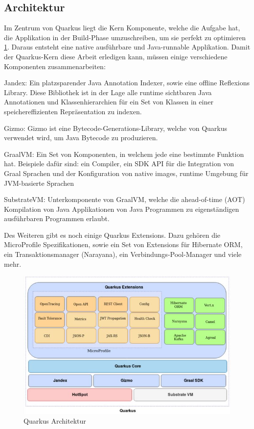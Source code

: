 \subsection{Architektur}
Im Zentrum von Quarkus liegt die Kern Komponente, welche die Aufgabe hat, die Applikation in der Build-Phase umzuschreiben, um sie perfekt zu optimieren \ref{fig:impl:QuarkusArchitektur}. Daraus entsteht eine native ausführbare und Java-runnable Applikation. Damit der Quarkus-Kern diese Arbeit erledigen kann, müssen einige verschiedene Komponenten zusammenarbeiten:
 
\begin{compactitem}
    \item Jandex: Ein platzsparender Java Annotation Indexer, sowie eine offline Reflexions Library. Diese Bibliothek ist in der Lage alle runtime sichtbaren Java Annotationen und Klassenhierarchien für ein Set von Klassen in einer speichereffizienten Repräsentation zu indexen.    
    \item Gizmo: Gizmo ist eine Bytecode-Generations-Library, welche von Quarkus verwendet wird, um Java Bytecode zu produzieren.             
    \item GraalVM: Ein Set von Komponenten, in welchem jede eine bestimmte Funktion hat. Beispiele dafür sind: ein Compiler, ein SDK API für die Integration von Graal Sprachen und der Konfiguration von native images, runtime Umgebung für JVM-basierte Sprachen
    \item SubstrateVM: Unterkomponente von GraalVM, welche die ahead-of-time (AOT) Kompilation von Java Applikationen von Java Programmen zu eigenständigen ausführbaren Programmen erlaubt.
\end{compactitem}
 
Des Weiteren gibt es noch einige Quarkus Extensions. Dazu gehören die MicroProfile Spezifikationen, sowie ein Set von Extensions für Hibernate ORM, ein Transaktionsmanager (Narayana), ein Verbindungs-Pool-Manager und viele mehr.
 
\begin{figure}
    \centering
    \includegraphics[scale=0.9]{pics/quarkusArchitektur.JPG}
    \caption{Quarkus Architektur}
    \label{fig:impl:QuarkusArchitektur}
\end{figure}
 
